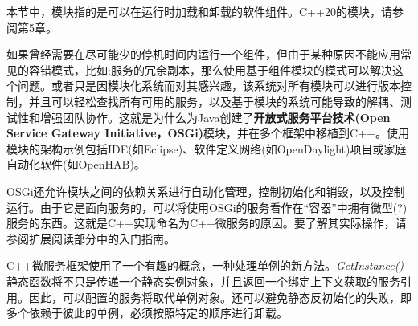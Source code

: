 \begin{tcolorbox}[colback=blue!5!white,colframe=blue!75!black, title=Note]
\hspace*{0.8cm}本节中，模块指的是可以在运行时加载和卸载的软件组件。C++20的模块，请参阅第5章。
\end{tcolorbox}

如果曾经需要在尽可能少的停机时间内运行一个组件，但由于某种原因不能应用常见的容错模式，比如:服务的冗余副本，那么使用基于组件模块的模式可以解决这个问题。或者只是因模块化系统而对其感兴趣，该系统对所有模块可以进行版本控制，并且可以轻松查找所有可用的服务，以及基于模块的系统可能导致的解耦、测试性和增强团队协作。这就是为什么为Java创建了\textbf{开放式服务平台技术(Open Service Gateway Initiative，OSGi)}模块，并在多个框架中移植到C++。使用模块的架构示例包括IDE(如Eclipse)、软件定义网络(如OpenDaylight)项目或家庭自动化软件(如OpenHAB)。

OSGi还允许模块之间的依赖关系进行自动化管理，控制初始化和销毁，以及控制运行。由于它是面向服务的，可以将使用OSGi的服务看作在“容器”中拥有微型(?)服务的东西。这就是C++实现命名为C++微服务的原因。要了解其实际操作，请参阅扩展阅读部分中的入门指南。

C++微服务框架使用了一个有趣的概念，一种处理单例的新方法。\textit{GetInstance()}静态函数将不只是传递一个静态实例对象，并且返回一个绑定上下文获取的服务引用。因此，可以配置的服务将取代单例对象。还可以避免静态反初始化的失败，即多个依赖于彼此的单例，必须按照特定的顺序进行卸载。





